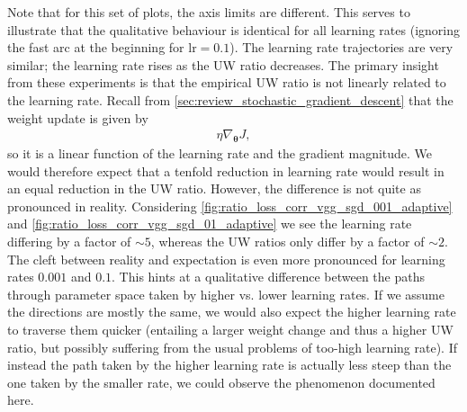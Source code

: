 Note that for this set of plots, the axis limits are different. This serves to
illustrate that the qualitative behaviour is identical for all learning rates
(ignoring the fast arc at the beginning for $\text{lr}=0.1$). The learning rate
trajectories are very similar; the learning rate rises as the UW ratio
decreases. The primary insight from these experiments is that the empirical UW ratio is
not linearly related to the learning rate. Recall from
\cref{sec:review_stochastic_gradient_descent} that the weight update is given by
\begin{align}
    \eta \nabla_{\boldsymbol\theta}J,
\end{align}
so it is a linear function of the learning rate and the gradient magnitude. We
would therefore expect that a tenfold reduction in learning rate would result in
an equal reduction in the UW ratio. However, the difference is not quite as
pronounced in reality. Considering
\cref{fig:ratio_loss_corr_vgg_sgd_001_adaptive} and
\cref{fig:ratio_loss_corr_vgg_sgd_01_adaptive} we see the learning rate
differing by a factor of $\sim{}5$, whereas the UW ratios only differ by a factor of
$\sim{}2$. The cleft between reality and expectation is even more pronounced for
learning rates $0.001$ and $0.1$. This hints at a qualitative difference between
the paths through parameter space taken by higher vs. lower learning rates. If
we assume the directions are mostly the same, we would also expect the higher
learning rate to traverse them quicker (entailing a larger weight change and
thus a higher UW ratio, but possibly suffering from the usual problems of
too-high learning rate). If instead the path taken by the higher learning rate
is actually less steep than the one taken by the smaller rate, we could observe
the phenomenon documented here.

